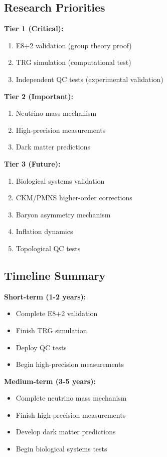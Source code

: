\documentclass[11pt]{article}
\theoremstyle{definition}
\begin{document}
\subsection{Research Priorities}

\textbf{Tier 1 (Critical):}
\begin{enumerate}
\item E8+2 validation (group theory proof)
\item TRG simulation (computational test)
\item Independent QC tests (experimental validation)
\end{enumerate}

\textbf{Tier 2 (Important):}
\begin{enumerate}
\item Neutrino mass mechanism
\item High-precision measurements
\item Dark matter predictions
\end{enumerate}

\textbf{Tier 3 (Future):}
\begin{enumerate}
\item Biological systems validation
\item CKM/PMNS higher-order corrections
\item Baryon asymmetry mechanism
\item Inflation dynamics
\item Topological QC tests
\end{enumerate}

\subsection{Timeline Summary}

\textbf{Short-term (1-2 years):}
\begin{itemize}
\item Complete E8+2 validation
\item Finish TRG simulation
\item Deploy QC tests
\item Begin high-precision measurements
\end{itemize}

\textbf{Medium-term (3-5 years):}
\begin{itemize}
\item Complete neutrino mass mechanism
\item Finish high-precision measurements
\item Develop dark matter predictions
\item Begin biological systems tests
\end{itemize}
\end{document}
